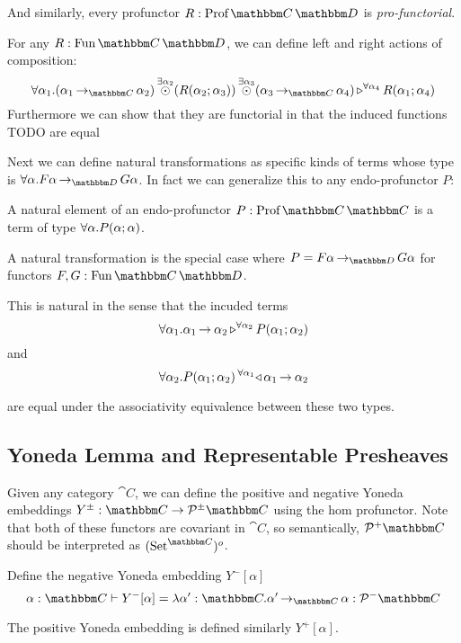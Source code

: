 \documentclass{llncs}
\begin{document}
And similarly, every profunctor $R : \harr {\cat C}{\cat D}$ is
\emph{pro-functorial}.
\begin{definition}
  For any $R : \varr {\cat C} {\cat D}$, we can define left and right
  actions of composition:
  \[ \homunary {\alpha_1} {\tensorexistsXwithYandZ {\alpha_2} {(\punitinXfromYtoZ {\cat C} {\alpha_1}{\alpha_2})} {\tensorexistsXwithYandZ {\alpha_3} {(\harrapp R {\alpha_2} {\alpha_3})}}{(\punitinXfromYtoZ {\cat C} {\alpha_3}{\alpha_4})}} {\alpha_4} {\harrapp R {\alpha_1}{\alpha_4}}
  \]
  Furthermore we can show that they are functorial in that the induced functions
  TODO
  are equal
\end{definition}

Next we can define natural transformations as specific kinds of terms
whose type is $\pendallXdotY {\alpha} \punitinXfromYtoZ {\cat D} {F
  \alpha}{G \alpha}$. In fact we can generalize this to any
endo-profunctor $P$:
\begin{definition}
  A natural element of an endo-profunctor $P : \harr {\cat C}{\cat C}$
  is a term of type $\pendallXdotY {\alpha} \harrapp P \alpha \alpha$.

  A natural transformation is the special case where $P =
  \punitinXfromYtoZ {\cat D} {F \alpha}{G \alpha}$ for functors $F, G
  : \varr {\cat C}{\cat D}$.

  This is natural in the sense that the incuded terms
  \[ \homunary {\alpha_1}{\punitinXfromYtoZ {} {\alpha_1}{\alpha_2}} {\alpha_2} {\harrapp P {\alpha_1}{\alpha_2}}  \]
  and
  \[ \pendallXdotY {\alpha_2} \homlallXYtoZ {\alpha_1} {\punitinXfromYtoZ {} {\alpha_1}{\alpha_2}} {\harrapp P {\alpha_1}{\alpha_2}}\]

  are equal under the associativity equivalence between these two
  types.
\end{definition}

\subsection{Yoneda Lemma and Representable Presheaves}

Given any category $\cat C$, we can define the positive and negative
Yoneda embeddings $Y^\pm : \cat C \to \pmPresheaf {\cat C}$ using the
hom profunctor. Note that both of these functors are covariant in
$\cat C$, so semantically, $\posPresheaf {\cat C}$ should be
interpreted as $(\Set^{\cat C})^o$.

\begin{definition}
  Define the negative Yoneda embedding $Y^-[\alpha]$
  \[ \alpha:\cat C \vdash Y^-[\alpha] = \lambda \alpha':\cat C. \punitinXfromYtoZ {\cat C}{\alpha'}{\alpha} : \negPresheaf {\cat C} \]

  The positive Yoneda embedding is defined similarly $Y^+[\alpha]$.
\end{definition}
\end{document}
